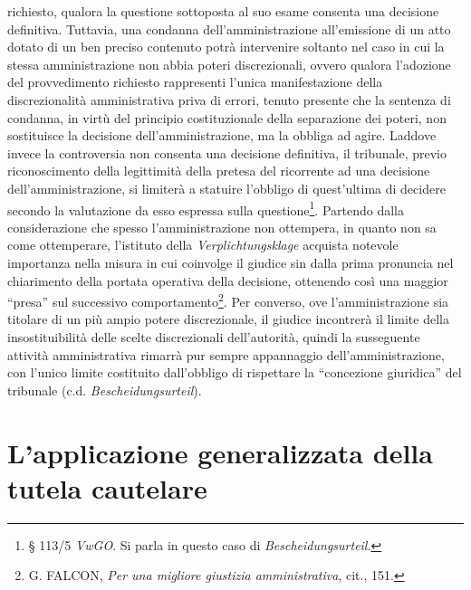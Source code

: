 \documentclass[12pt,it,a4paper,]{report}
\begin{document}
richiesto, qualora la questione sottoposta al suo esame consenta una
decisione definitiva. Tuttavia, una condanna dell'amministrazione
all'emissione di un atto dotato di un ben preciso contenuto potrà
intervenire soltanto nel caso in cui la stessa amministrazione non abbia
poteri discrezionali, ovvero qualora l'adozione del provvedimento
richiesto rappresenti l'unica manifestazione della discrezionalità
amministrativa priva di errori, tenuto presente che la sentenza di
condanna, in virtù del principio costituzionale della separazione dei
poteri, non sostituisce la decisione dell'amministrazione, ma la obbliga
ad agire. Laddove invece la controversia non consenta una decisione
definitiva, il tribunale, previo riconoscimento della legittimità della
pretesa del ricorrente ad una decisione dell'amministrazione, si
limiterà a statuire l'obbligo di quest'ultima di decidere secondo la
valutazione da esso espressa sulla questione\footnote{§ 113/5
  \emph{VwGO}. Si parla in questo caso di \emph{Bescheidungsurteil}.}.
Partendo dalla considerazione che spesso l'amministrazione non
ottempera, in quanto non sa come ottemperare, l'istituto della
\emph{Verplichtungsklage} acquista notevole importanza nella misura in
cui coinvolge il giudice sin dalla prima pronuncia nel chiarimento della
portata operativa della decisione, ottenendo così una maggior ``presa''
sul successivo comportamento\footnote{G. FALCON, \emph{Per una migliore
  giustizia amministrativa}, cit., 151.}. Per converso, ove
l'amministrazione sia titolare di un più ampio potere discrezionale, il
giudice incontrerà il limite della insostituibilità delle scelte
discrezionali dell'autorità, quindi la susseguente attività
amministrativa rimarrà pur sempre appannaggio dell'amministrazione, con
l'unico limite costituito dall'obbligo di rispettare la ``concezione
giuridica'' del tribunale (c.d. \emph{Bescheidungsurteil}).

\hypertarget{lapplicazione-generalizzata-della-tutela-cautelare}{%
\section{L'applicazione generalizzata della tutela
cautelare}\label{lapplicazione-generalizzata-della-tutela-cautelare}}
\end{document}

